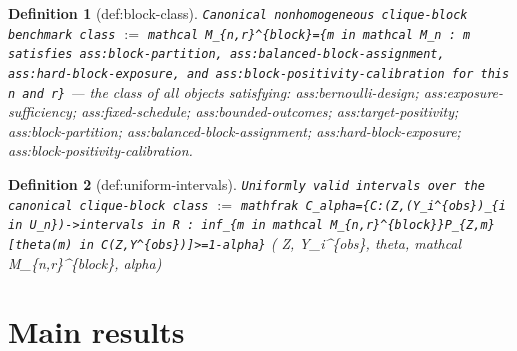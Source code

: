 \documentclass{article}
\newtheorem{definition}{Definition}
\begin{document}
\begin{definition}[def:block-class]\label{def:block-class}
\texttt{Canonical nonhomogeneous clique-block benchmark class} $:=$ \texttt{mathcal M\_\{n,r\}\textasciicircum{}\{block\}=\{m in mathcal M\_n : m satisfies ass:block-partition, ass:balanced-block-assignment, ass:hard-block-exposure, and ass:block-positivity-calibration for this n and r\}} --- the class of all objects satisfying: ass:bernoulli-design; ass:exposure-sufficiency; ass:fixed-schedule; ass:bounded-outcomes; ass:target-positivity; ass:block-partition; ass:balanced-block-assignment; ass:hard-block-exposure; ass:block-positivity-calibration.
\end{definition}

\begin{definition}[def:uniform-intervals]\label{def:uniform-intervals}
\texttt{Uniformly valid intervals over the canonical clique-block class} $:=$ \texttt{mathfrak C\_alpha=\{C:(Z,(Y\_i\textasciicircum{}\{obs\})\_\{i in U\_n\})->intervals in R : inf\_\{m in mathcal M\_\{n,r\}\textasciicircum{}\{block\}\}P\_\{Z,m\}[theta(m) in C(Z,Y\textasciicircum{}\{obs\})]>=1-alpha\}} \quad ( Z, Y\_i\textasciicircum{}\{obs\}, theta, mathcal M\_\{n,r\}\textasciicircum{}\{block\}, alpha)
\end{definition}

\section{Main results}
\end{document}
